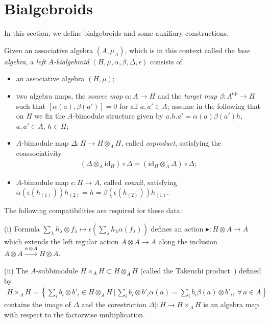 \documentclass[pdftex]{sigma}
\def\op{\mathrm{op}}
\def\id{\mathrm{id}}
\numberwithin{equation}{section}
\begin{document}
\section{Bialgebroids}\label{sec:bialgebroids}

In this section, we define bialgebroids and some auxiliary constructions.
\begin{Definition}
Given an associative algebra $(A,\mu_A)$, which is in this context called the {\it base algebra}, a {\it left $A$-bialgebroid} $(H,\mu,\alpha,\beta,\Delta,\epsilon)$ consists of
\begin{itemize}\itemsep=0pt
\item an associative algebra $(H,\mu)$;
\item two algebra maps, the {\it source map} $\alpha\colon A\to H$ and the {\it target map} $\beta\colon A^\op\to H$ such that $[\alpha(a),\beta(a')] = 0$ for all $a,a'\in A$; assume in the following that on $H$ we fix the $A$-bimodule
structure given by $a.h.a' = \alpha(a)\beta(a')h$, $a,a'\in A$, $h\in H$;

\item $A$-bimodule map $\Delta \colon H\to H\otimes_A H$, called {\it coproduct}, satisfying the coassociativity
\begin{gather*}
(\Delta\otimes_A \id_H)\circ\Delta = (\id_H\otimes_A \Delta)\circ\Delta;
\end{gather*}
\item $A$-bimodule map $\epsilon \colon H\to A$, called {\it counit}, satisfying $\alpha(\epsilon(h_{(1)}))h_{(2)} = h = \beta(\epsilon(h_{(2)}))h_{(1)}$.
\end{itemize}
The following compatibilities are required for these data:

(i) Formula $\sum_\lambda h_\lambda\otimes f_\lambda \mapsto \epsilon(\sum_\lambda h_\lambda\alpha(f_\lambda))$ defines an action $\blacktriangleright\colon H\otimes A\to A$ which extends the left regular action $A\otimes A\to A$ along the inclusion $A\otimes A\stackrel{\alpha\otimes A}\longrightarrow H\otimes A$.

(ii) The $A$-subbimodule $H\times_A H\subset H\otimes_A H$ (called the Takeuchi product~\cite{bohmHbk}) defined by
\begin{gather*}
H\times_A H = \left\lbrace\sum_i b_i\otimes b'_i \in H\otimes_A H \,|\,
\sum_i b_i\otimes b'_i \alpha(a) = \sum_i b_i \beta(a)\otimes b'_i, \ \forall\, a\in A \right\rbrace
\end{gather*}
contains the image of $\Delta$ and the corestriction $\Delta|\colon H\to H\times_A H$ is an algebra map with respect to the factorwise multiplication.
\end{Definition}
\end{document}
